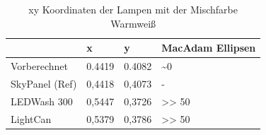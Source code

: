 \documentclass[11pt]{scrartcl}
\begin{document}
\noindent
\begin{table}[H]
    \begin{tabularx}{\textwidth}{|X|X|X|X|}
        \hline           & x        & y        & MacAdam Ellipsen\\\hline
        Vorberechnet     & 0.4419   & 0.4082   & \textasciitilde 0\\\hline
        SkyPanel (Ref)   & 0,4418   & 0,4073   & -\\\hline
        LEDWash 300      & 0,5447   & 0,3726   & >> 50\\\hline
        LightCan         & 0,5379   & 0,3786   & >> 50\\\hline
    \end{tabularx}
    \caption{xy Koordinaten der Lampen mit der Mischfarbe Warmweiß}
\end{table}
\clearpage
\end{document}
